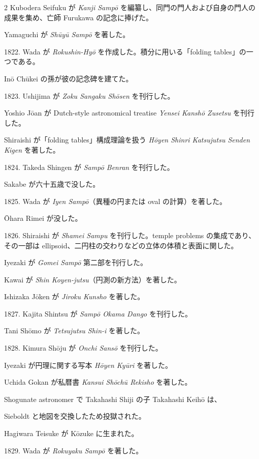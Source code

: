 \documentclass[11pt]{article}
\newcommand{\scanpage}[2]{\clearpage\setcounter{footnote}{0}\noindent{\footnotesize\color{gray}PDF #1 頁 · #2}\par\medskip}
\begin{document}
\scanpage{0202}{第23章年表、印刷頁188}
\begin{multicols}{2}\small
Kubodera Seifuku が \emph{Kanji Sampō} を編纂し、同門の門人および自身の門人の成果を集め、亡師 Furukawa の記念に捧げた。

Yamaguchi が \emph{Shūyū Sampō} を著した。

1822. Wada が \emph{Rokushin-Hyō} を作成した。積分に用いる「folding tables」の一つである。

Inō Chūkei の孫が彼の記念碑を建てた。

1823. Ushijima が \emph{Zoku Sangaku Shōsen} を刊行した。

Yoshio Jōan が Dutch-style astronomical treatise \emph{Yensei Kanshō Zusetsu} を刊行した。

Shiraishi が「folding tables」構成理論を扱う \emph{Hōyen Shinri Katsujutsu Senden Kigen} を著した。

1824. Takeda Shingen が \emph{Sampō Benran} を刊行した。

Sakabe が六十五歳で没した。

1825. Wada が \emph{Iyen Sampō}（異種の円または oval の計算）を著した。

Ōhara Rimei が没した。

1826. Shiraishi が \emph{Shamei Sampu} を刊行した。temple problems の集成であり、その一部は ellipsoid、二円柱の交わりなどの立体の体積と表面に関した。

Iyezaki が \emph{Gomei Sampō} 第二部を刊行した。

Kawai が \emph{Shin Koyen-jutsu}（円測の新方法）を著した。

Ishizaka Jōken が \emph{Jiroku Kunsho} を著した。

1827. Kajita Shintsu が \emph{Sampō Okama Dango} を刊行した。

Tani Shōmo が \emph{Tetsujutsu Shin-i} を著した。

1828. Kimura Shōju が \emph{Onchi Sansō} を刊行した。

Iyezaki が円理に関する写本 \emph{Hōyen Kyūri} を著した。

Uchida Gokan が私暦書 \emph{Kansui Shōchū Rekisho} を著した。

Shogunate astronomer で Takahashi Shiji の子 Takahashi Keihō は、

\columnbreak
Sieboldt と地図を交換したため投獄された。

Hagiwara Teisuke が Kōzuke に生まれた。

1829. Wada が \emph{Rokuyaku Sampō} を著した。


\end{multicols}
\end{document}
